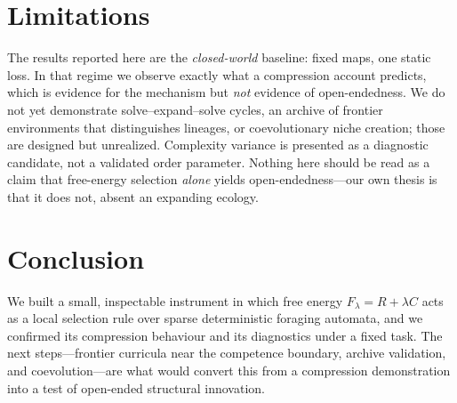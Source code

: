 \documentclass[11pt]{article}
\begin{document}
\section{Limitations}
The results reported here are the \emph{closed-world} baseline: fixed maps, one static
loss. In that regime we observe exactly what a compression account predicts, which is
evidence for the mechanism but \emph{not} evidence of open-endedness. We do not yet
demonstrate solve--expand--solve cycles, an archive of frontier environments that
distinguishes lineages, or coevolutionary niche creation; those are designed but
unrealized. Complexity variance is presented as a diagnostic candidate, not a validated
order parameter. Nothing here should be read as a claim that free-energy selection
\emph{alone} yields open-endedness---our own thesis is that it does not, absent an
expanding ecology.

\section{Conclusion}
We built a small, inspectable instrument in which free energy $F_\lambda = R + \lambda C$
acts as a local selection rule over sparse deterministic foraging automata, and we
confirmed its compression behaviour and its diagnostics under a fixed task. The next
steps---frontier curricula near the competence boundary, archive validation, and
coevolution---are what would convert this from a compression demonstration into a test
of open-ended structural innovation.



\end{document}
